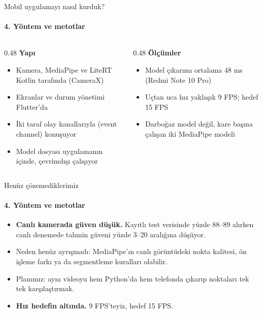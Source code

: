 \documentclass[aspectratio=169,11pt]{beamer}
\begin{document}
\begin{frame}{Mobil uygulamayı nasıl kurduk?}
\framesubtitle{4. Yöntem ve metotlar}
\begin{columns}[T]
\begin{column}{0.48\textwidth}
\textbf{Yapı}
\begin{itemize}
\item Kamera, MediaPipe ve LiteRT Kotlin tarafında (CameraX)
\item Ekranlar ve durum yönetimi Flutter'da
\item İki taraf olay kanallarıyla (event channel) konuşuyor
\item Model dosyası uygulamanın içinde, çevrimdışı çalışıyor
\end{itemize}
\end{column}
\begin{column}{0.48\textwidth}
\textbf{Ölçümler}
\begin{itemize}
\item Model çıkarımı ortalama 48 ms (Redmi Note 10 Pro)
\item Uçtan uca hız yaklaşık 9 FPS; hedef 15 FPS
\item Darboğaz model değil, kare başına çalışan iki MediaPipe modeli
\end{itemize}
\end{column}
\end{columns}
\end{frame}

\begin{frame}{Henüz çözemediklerimiz}
\framesubtitle{4. Yöntem ve metotlar}
\begin{itemize}
\item \textbf{Canlı kamerada güven düşük.} Kayıtlı test verisinde yüzde 88--89 alırken canlı denemede tahmin güveni yüzde 3--20 aralığına düşüyor.
\item Neden henüz ayrışmadı: MediaPipe'ın canlı görüntüdeki nokta kalitesi, ön işleme farkı ya da segmentleme kuralları olabilir.
\item Planımız: aynı videoyu hem Python'da hem telefonda çıkarıp noktaları tek tek karşılaştırmak.
\end{itemize}

\vspace{3mm}
\begin{itemize}
\item \textbf{Hız hedefin altında.} 9 FPS'teyiz, hedef 15 FPS.
\end{itemize}
\end{frame}
\end{document}
